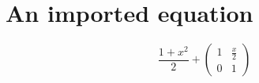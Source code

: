\documentclass{article}
\begin{document}
\section{An imported equation}
\[
  \frac{1+x^2}{2} +
  \begin{pmatrix}
    1 & \frac{x}{2} \\
    0 & 1
  \end{pmatrix}
\]
\end{document}
